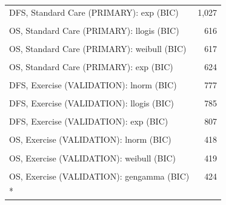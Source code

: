 \begin{ThreePartTable}
\begin{longtable}[t]{lr}
\textcolor[HTML]{2D3748}{DFS, Standard Care (PRIMARY): exp (BIC)} & \textcolor[HTML]{2D3748}{1,027}\\
\cellcolor[HTML]{F7F9FC}{\textcolor[HTML]{2D3748}{OS, Standard Care (PRIMARY): lnorm (BIC)}} & \cellcolor[HTML]{F7F9FC}{\textcolor[HTML]{2D3748}{612}}\\
\textcolor[HTML]{2D3748}{OS, Standard Care (PRIMARY): llogis (BIC)} & \textcolor[HTML]{2D3748}{616}\\
\cellcolor[HTML]{F7F9FC}{\textcolor[HTML]{2D3748}{OS, Standard Care (PRIMARY): gengamma (BIC)}} & \cellcolor[HTML]{F7F9FC}{\textcolor[HTML]{2D3748}{616}}\\
\textcolor[HTML]{2D3748}{OS, Standard Care (PRIMARY): weibull (BIC)} & \textcolor[HTML]{2D3748}{617}\\
\cellcolor[HTML]{F7F9FC}{\textcolor[HTML]{2D3748}{OS, Standard Care (PRIMARY): gompertz (BIC)}} & \cellcolor[HTML]{F7F9FC}{\textcolor[HTML]{2D3748}{623}}\\
\textcolor[HTML]{2D3748}{OS, Standard Care (PRIMARY): exp (BIC)} & \textcolor[HTML]{2D3748}{624}\\
\cellcolor[HTML]{F7F9FC}{\textcolor[HTML]{2D3748}{DFS, Exercise (VALIDATION): gompertz (BIC)}} & \cellcolor[HTML]{F7F9FC}{\textcolor[HTML]{2D3748}{775}}\\
\textcolor[HTML]{2D3748}{DFS, Exercise (VALIDATION): lnorm (BIC)} & \textcolor[HTML]{2D3748}{777}\\
\cellcolor[HTML]{F7F9FC}{\textcolor[HTML]{2D3748}{DFS, Exercise (VALIDATION): gengamma (BIC)}} & \cellcolor[HTML]{F7F9FC}{\textcolor[HTML]{2D3748}{780}}\\
\textcolor[HTML]{2D3748}{DFS, Exercise (VALIDATION): llogis (BIC)} & \textcolor[HTML]{2D3748}{785}\\
\cellcolor[HTML]{F7F9FC}{\textcolor[HTML]{2D3748}{DFS, Exercise (VALIDATION): weibull (BIC)}} & \cellcolor[HTML]{F7F9FC}{\textcolor[HTML]{2D3748}{788}}\\
\textcolor[HTML]{2D3748}{DFS, Exercise (VALIDATION): exp (BIC)} & \textcolor[HTML]{2D3748}{807}\\
\cellcolor[HTML]{F7F9FC}{\textcolor[HTML]{2D3748}{OS, Exercise (VALIDATION): exp (BIC)}} & \cellcolor[HTML]{F7F9FC}{\textcolor[HTML]{2D3748}{418}}\\
\textcolor[HTML]{2D3748}{OS, Exercise (VALIDATION): lnorm (BIC)} & \textcolor[HTML]{2D3748}{418}\\
\cellcolor[HTML]{F7F9FC}{\textcolor[HTML]{2D3748}{OS, Exercise (VALIDATION): llogis (BIC)}} & \cellcolor[HTML]{F7F9FC}{\textcolor[HTML]{2D3748}{419}}\\
\textcolor[HTML]{2D3748}{OS, Exercise (VALIDATION): weibull (BIC)} & \textcolor[HTML]{2D3748}{419}\\
\cellcolor[HTML]{F7F9FC}{\textcolor[HTML]{2D3748}{OS, Exercise (VALIDATION): gompertz (BIC)}} & \cellcolor[HTML]{F7F9FC}{\textcolor[HTML]{2D3748}{421}}\\
\textcolor[HTML]{2D3748}{OS, Exercise (VALIDATION): gengamma (BIC)} & \textcolor[HTML]{2D3748}{424}\\*
\end{longtable}
\end{ThreePartTable}
\endgroup{}
